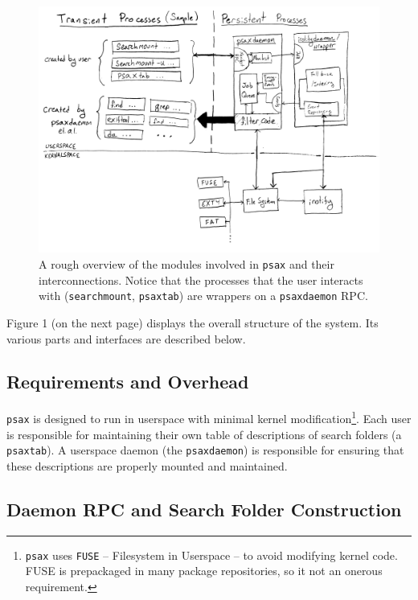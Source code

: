 \documentclass[a4paper]{report}
\newcommand{\inlinecode}{\texttt}
\begin{document}
\begin{figure}[h!]
  \centering
  \includegraphics[width=1.0\textwidth]{structure}
  \caption{A rough overview of the modules involved in \inlinecode{psax} and their interconnections. Notice that the processes that the user interacts with (\inlinecode{searchmount}, \inlinecode{psaxtab}) are wrappers on a \inlinecode{psaxdaemon} RPC.}
\end{figure}

Figure 1 (on the next page) displays the overall structure of the system. Its various parts and interfaces are described below.

\subsection{Requirements and Overhead}

\inlinecode{psax} is designed to run in userspace with minimal kernel modification\footnote{\inlinecode{psax} uses \inlinecode{FUSE} -- Filesystem in Userspace -- to avoid modifying kernel code. FUSE is prepackaged in many package repositories, so it not an onerous requirement.}. Each user is responsible for maintaining their own table of descriptions of search folders (a \inlinecode{psaxtab}). A userspace daemon (the \inlinecode{psaxdaemon}) is responsible for ensuring that these descriptions are properly mounted and maintained.

\subsection{Daemon RPC and Search Folder Construction}
\end{document}
